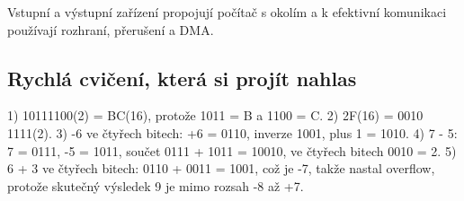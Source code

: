 Vstupní a výstupní zařízení propojují počítač s okolím a k efektivní komunikaci používají rozhraní, přerušení a DMA.


\subsection*{Rychlá cvičení, která si projít nahlas}

1) 10111100(2) = BC(16), protože 1011 = B a 1100 = C. 2) 2F(16) = 0010 1111(2). 3) -6 ve čtyřech bitech: +6 = 0110, inverze 1001, plus 1 = 1010. 4) 7 - 5: 7 = 0111, -5 = 1011, součet 0111 + 1011 = 10010, ve čtyřech bitech 0010 = 2. 5) 6 + 3 ve čtyřech bitech: 0110 + 0011 = 1001, což je -7, takže nastal overflow, protože skutečný výsledek 9 je mimo rozsah -8 až +7.

\newpage

